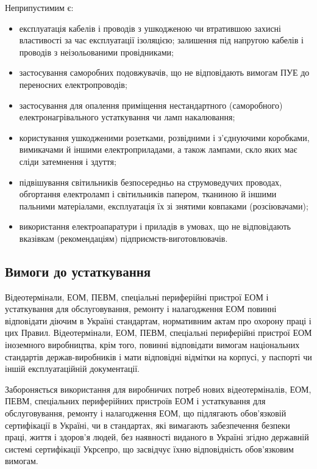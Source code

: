 \documentclass[simple,a4paper,14pt,ukrainian,utf8]{eskdtext}
\begin{document}
\begin{appendices}
                Неприпустимим є:

                \begin{itemize}
                    \item експлуатація кабелів і проводів з ушкодженою чи втратившою захисні властивості за час експлуатації ізоляцією; залишення під напругою кабелів і проводів з неізольованими провідниками;
                    \item застосування саморобних подовжувачів, що не відповідають вимогам ПУЕ до переносних електропроводів;
                    \item застосування для опалення приміщення нестандартного (саморобного) електронагрівального устаткування чи ламп накалювання;
                    \item користування ушкодженими розетками, розвідними і з'єднуючими коробками, вимикачами й іншими електроприладами, а також лампами, скло яких має сліди затемнення і здуття;
                    \item підвішування світильників безпосередньо на струмоведучих проводах, обгортання електроламп і світильників папером, тканиною й іншими пальними матеріалами, експлуатація їх зі знятими ковпаками (розсіювачами);
                    \item використання електроапаратури і приладів в умовах, що не відповідають вказівкам (рекомендаціям) підприємств-виготовлювачів.
                \end{itemize}

            \subsection{Вимоги до устаткування}

                Відеотермінали, ЕОМ, ПЕВМ, спеціальні периферійні пристрої ЕОМ і устаткування для обслуговування, ремонту і налагодження ЕОМ повинні відповідати діючим в Україні стандартам, нормативним актам про охорону праці і цих Правил. Відеотермінали, ЕОМ, ПЕВМ, спеціальні периферійні пристрої ЕОМ іноземного виробництва, крім того, повинні відповідати вимогам національних стандартів держав-виробників і мати відповідні відмітки на корпусі, у паспорті чи іншій експлуатаційній документації.

                Забороняється використання для виробничих потреб нових відеотерміналів, ЕОМ, ПЕВМ, спеціальних периферійних пристроїв ЕОМ і устаткування для обслуговування, ремонту і налагодження ЕОМ, що підлягають обов'язковій сертифікації в Україні, чи в стандартах, які вимагають забезпечення безпеки праці, життя і здоров'я людей, без наявності виданого в Україні згідно державній системі сертифікації Укрсепро, що засвідчує їхню відповідність обов'язковим вимогам.


\end{appendices}
\end{document}

